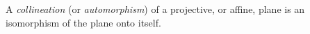 A \emph{collineation} (or \emph{automorphism}) of a projective, or affine, plane is an isomorphism of the plane onto itself.
